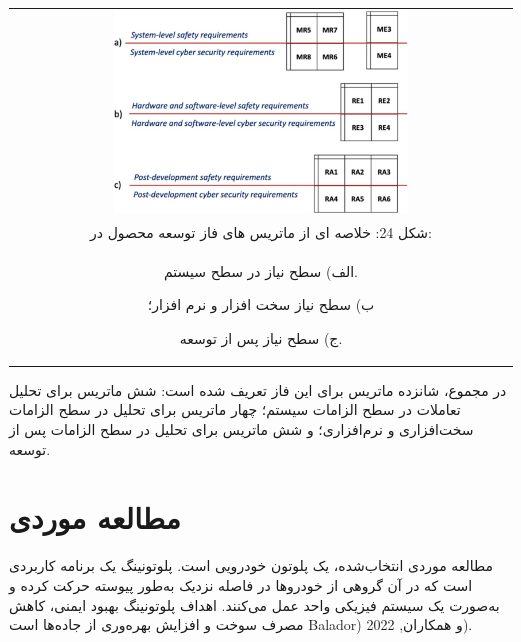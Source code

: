 \documentclass[a4paper,10pt]{article}
\begin{document}
                \begin{table}
            
                    \centering
                    \begin{tabular}{ c }
                        
                        \includegraphics[width=0.6\textwidth]{Image/fig24.jpg} \\

                        شکل 24: خلاصه ای از ماتریس های فاز توسعه محصول در:\\
                        
                        الف) سطح نیاز در سطح سیستم.
                        
                        ب) سطح نیاز سخت افزار و نرم افزار؛
                        
                        ج) سطح نیاز پس از توسعه.

                    \end{tabular}
        
                \end{table}

                در مجموع، شانزده ماتریس برای این فاز تعریف شده است: شش ماتریس برای تحلیل تعاملات در سطح الزامات سیستم؛ چهار ماتریس برای تحلیل در سطح الزامات سخت‌افزاری و نرم‌افزاری؛ و شش ماتریس برای تحلیل در سطح الزامات پس از توسعه.

    \section{مطالعه موردی}

        مطالعه موردی انتخاب‌شده، یک پلوتون خودرویی است. پلوتونینگ یک برنامه کاربردی است که در آن گروهی از خودروها در فاصله نزدیک به‌طور پیوسته حرکت کرده و به‌صورت یک سیستم فیزیکی واحد عمل می‌کنند. اهداف پلوتونینگ بهبود ایمنی، کاهش مصرف سوخت و افزایش بهره‌وری از جاده‌ها است Balador) و همکاران, 2022).
\end{document}
